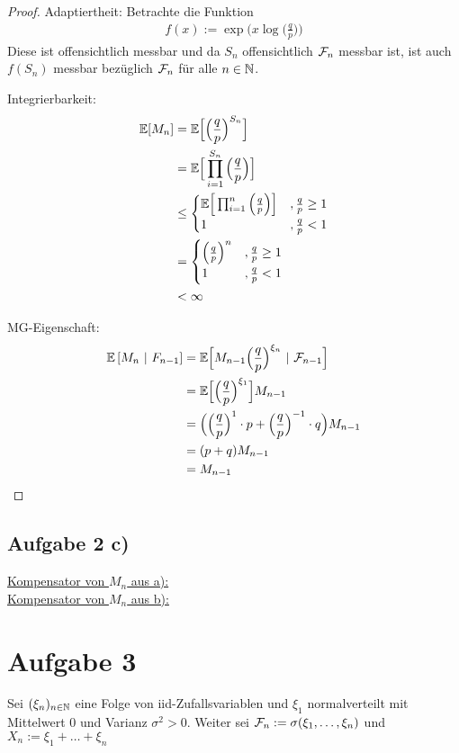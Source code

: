 \documentclass[12pt,a4paper]{article}
\begin{document}
\begin{proof}
	Adaptiertheit: \enter
	Betrachte die Funktion
	\begin{align*}
		f(x):= \exp\Big(x \log\Big(\frac{q}{p}\Big)\Big)
	\end{align*}
	Diese ist offensichtlich messbar und da $S_n$ offensichtlich $\mathcal{F}_n$ messbar ist, ist auch
	$f(S_n)$ messbar bezüglich $\mathcal{F}_n$ für alle $n\in\mathbb{N}$.\enter

	Integrierbarkeit:
	\begin{align*}
		\mathbb{E}[M_n]
		&= \mathbb{E}\Big[\Big(\frac{q}{p}\Big)^{S_n}\Big] \\
		&= \mathbb{E}\Big[\prod_{i=1}^{S_n}\Big(\frac{q}{p}\Big)\Big] \\
		&\leq\begin{cases}
		\mathbb{E}\Big[\prod_{i=1}^{n}\Big(\frac{q}{p}\Big)\Big] &,\frac{q}{p}\geq 1 \\
		1 &,\frac{q}{p} < 1 
	\end{cases} \\
		&=\begin{cases}
		\Big(\frac{q}{p}\Big)^n &,\frac{q}{p}\geq 1 \\
		1 &,\frac{q}{p} < 1 
	\end{cases} \\
	&< \infty
	\end{align*}

	MG-Eigenschaft:
	\begin{align*}
		\mathbb{E}\left[{M_n}~|~{F_{n-1}}\right]
		&=\mathbb{E}\Big[M_{n-1}\Big(\frac{q}{p}\Big)^{\xi_n}~|~\mathcal{F}_{n-1}\Big] \\
		&=\mathbb{E}\Big[\Big(\frac{q}{p}\Big)^{\xi_1}\Big] M_{n-1} \\
		&=\Big(\Big(\frac{q}{p}\Big)^1\cdot p + \Big(\frac{q}{p}\Big)^{-1}\cdot q\Big) M_{n-1} \\
		&= (p+q) M_{n-1} \\
		&= M_{n-1}
	\end{align*}

\end{proof}

\subsection*{Aufgabe 2 c)}
\underline{Kompensator von $M_n$ aus a):}\\

\underline{Kompensator von $M_n$ aus b):}\\

\section*{Aufgabe 3}
Sei $(\xi_n)_{n\in\mathbb{N}}$ eine Folge von iid-Zufallsvariablen und $\xi_1$ normalverteilt mit Mittelwert 0 und Varianz $\sigma^2>0$. Weiter sei $\mathcal{F}_n:=\sigma(\xi_1,\ldots,\xi_n)$ und $X_n:=\xi_1+\ldots+\xi_n$
\end{document}
